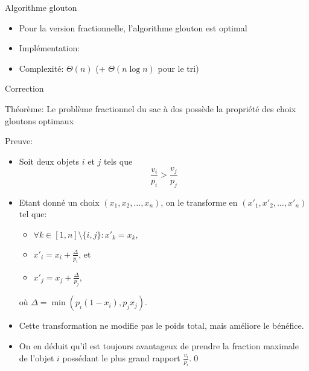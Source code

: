\begin{frame}{Algorithme glouton}

\begin{itemize}
\item Pour la version fractionnelle, l'algorithme glouton est optimal
\item Implémentation:

\bigskip

{\small
\begin{center}
\end{center}
}
\bigskip

\item Complexité: $\Theta(n)$ (+ $\Theta(n\log n)$ pour le tri)
\end{itemize}

\end{frame}

\begin{frame}{Correction}

\alert{Théorème:} Le problème fractionnel du sac à dos possède la propriété des choix gloutons optimaux

\bigskip

\alert{Preuve:}
\begin{itemize}
\item Soit deux objets $i$ et $j$ tels que
$$\frac{v_i}{p_i}>\frac{v_j}{p_j}$$
\item Etant donné un choix $(x_1,x_2,\ldots,x_n)$, on le transforme en $(x'_1,x'_2,\ldots, x'_n)$ tel que:
\begin{itemize}
\item $\forall k\in [1,n]\setminus\{i,j\}: x'_k=x_k,$
\item $x'_i=x_i+\frac{\Delta}{p_i}$, et
\item $x'_j=x_j+\frac{\Delta}{p_j}$,
\end{itemize}
où $\Delta=\min(p_i(1-x_i),p_jx_j)$.
\item Cette transformation ne modifie pas le poids total, mais améliore le bénéfice.
\item On en déduit qu'il est toujours avantageux de prendre la fraction maximale de l'objet $i$ possédant le plus grand rapport $\frac{v_i}{p_i}$.\qed
\end{itemize}

\end{frame}

